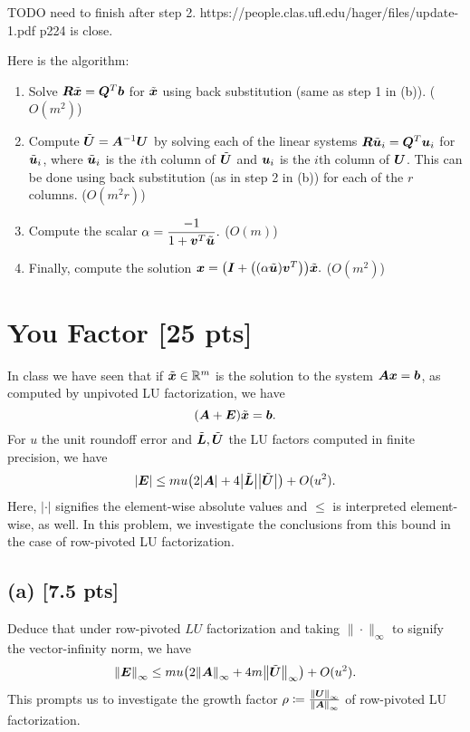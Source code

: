 \documentclass[twoside,10pt]{article}
\begin{document}
TODO need to finish after step 2.
https://people.clas.ufl.edu/hager/files/update-1.pdf p224 is close.

\quad Here is the algorithm:
\begin{enumerate}
  \item Solve $\bm{R}\tilde{\bm{x}} = \bm{Q}^T\bm{b}$ for $\tilde{\bm{x}}$ using back substitution (same as step 1 in (b)). ($O(m^2)$)
  \item Compute $\tilde{\bm{U}} = \bm{A}^{-1}\bm{U}$ by solving each of the linear systems $\bm{R}\tilde{\bm{u}}_i = \bm{Q}^T\bm{u}_i$ for $\tilde{\bm{u}}_i$, where $\tilde{\bm{u}}_i$ is the $i$th column of $\tilde{\bm{U}}$ and $\bm{u}_i$ is the $i$th column of $\bm{U}$.
  This can be done using back substitution (as in step 2 in (b)) for each of the $r$ columns. ($O(m^2r)$)
  \item Compute the scalar $\alpha = \dfrac{-1}{1+\bm{v}^T\tilde{\bm{u}}}.$ ($O(m)$)
  \item Finally, compute the solution $\vct{x} = \left(\vct{I} + \left(\left(\alpha\tilde{\vct{u}}\right)\vct{v}^T\right)\right)\tilde{\vct{x}}.$ ($O(m^2)$)
\end{enumerate}

\section{You Factor [25 pts]}
In class we have seen that if $\tilde{\bm{x}} \in \mathbb{R}^{m}$ is the solution to the system $\bm{A}\bm{x} = \bm{b}$, as computed by unpivoted LU factorization, we have  
\begin{equation}
  \left(\mtx{A} + \mtx{E}\right)\tilde{\vct{x}} = \vct{b}.  
\end{equation}
For $u$ the unit roundoff error and $\tilde{\bm{L}}, \tilde{\bm{U}}$ the LU factors computed in finite precision, we have
\begin{equation}
  \left|\mtx{E}\right| \leq m u \left(2 \left|\mtx{A}\right| + 4 \left|\tilde{\mtx{L}} \right| \left|\tilde{\mtx{U}}\right|\right) + O(u^2).
\end{equation}
Here, $|\cdot|$ signifies the element-wise absolute values and $\leq$ is interpreted element-wise, as well.
In this problem, we investigate the conclusions from this bound in the case of row-pivoted LU factorization.

\subsection*{(a) [7.5 pts]}
Deduce that under row-pivoted $LU$ factorization and taking $\| \cdot \|_{\infty}$ to signify the vector-infinity norm, we have 
\begin{equation}
  \left\|\mtx{E}\right\|_{\infty} \leq m u \left(2 \left\|\mtx{A}\right\|_{\infty} + 4 m \left\|\tilde{\mtx{U}}\right\|_{\infty} \right) + O(u^2).
\end{equation}
This prompts us to investigate the growth factor $\rho \coloneqq \frac{\left\| \mtx{U} \right\|_{\infty}}{\left\|\mtx{A}\right\|_{\infty}}$ of row-pivoted LU factorization.
\end{document}
